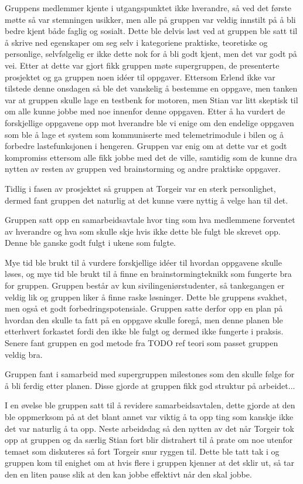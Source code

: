 Gruppens medlemmer kjente i utgangspunktet ikke hverandre, så ved det første møtte så var stemningen usikker, men alle på gruppen var veldig innstilt på å bli bedre kjent både faglig og sosialt.
Dette ble delvis løst ved at gruppen ble satt til å skrive ned egenskaper om seg selv i kategoriene praktiske, teoretiske og personlige, selvfølgelig er ikke dette nok for å bli godt kjent, men det var godt på vei.
Etter at dette var gjort fikk gruppen møte supergruppen, de presenterte prosjektet og ga gruppen noen idéer til oppgaver. Ettersom Erlend ikke var tilstede denne onsdagen så ble det vanskelig å bestemme en oppgave, men tanken var at gruppen skulle lage en testbenk for motoren, men Stian var litt skeptisk til om alle kunne jobbe med noe innenfor denne oppgaven. Etter å ha vurdert de forskjellige oppgavene opp mot hverandre ble vi enige om den endelige oppgaven som ble å lage et system som kommuniserte med telemetrimodule i bilen og å forbedre lastefunksjonen i hengeren. Gruppen var enig om at dette var et godt kompromiss ettersom alle fikk jobbe med det de ville, samtidig som de kunne dra nytten av resten av gruppen ved brainstorming og andre praktiske oppgaver.

Tidlig i fasen av prosjektet så gruppen at Torgeir var en sterk personlighet, dermed fant gruppen det naturlig at det kunne være nyttig å velge han til det.

Gruppen satt opp en samarbeidsavtale hvor ting som hva medlemmene forventet av hverandre og hva som skulle skje hvis ikke dette ble fulgt ble skrevet opp. Denne ble ganske godt fulgt i ukene som fulgte.

Mye tid ble brukt til å vurdere forskjellige idéer til hvordan oppgavene skulle løses, og mye tid ble brukt til å finne en brainstormingteknikk som fungerte bra for gruppen. Gruppen består av kun sivilingeniørstudenter, så tankegangen er veldig lik og gruppen liker å finne raske løsninger. Dette ble gruppens svakhet, men også et godt forbedringspotensiale. Gruppen satte derfor opp en plan på hvordan den skulle ta fatt på en oppgave skulle foregå, men denne planen ble etterhvert forkastet fordi den ikke ble fulgt og dermed ikke fungerte i praksis. Senere fant gruppen en god metode fra TODO ref teori som passet gruppen veldig bra. 

Gruppen fant i samarbeid med supergruppen milestones som den skulle følge for å bli ferdig etter planen. Disse gjorde at gruppen fikk god struktur på arbeidet...

I en øvelse ble gruppen satt til å revidere samarbeidsavtalen, dette gjorde at den ble oppmerksom på at det blant annet var viktig å ta opp ting som kanskje ikke det var naturlig å ta opp. Neste arbeidsdag så den nytten av det når Torgeir tok opp at gruppen og da særlig Stian fort blir distrahert til å prate om noe utenfor temaet som diskuteres så fort Torgeir snur ryggen til. Dette ble tatt tak i og gruppen kom til enighet om at hvis flere i gruppen kjenner at det sklir ut, så tar den en liten pause slik at den kan jobbe effektivt når den skal jobbe.

